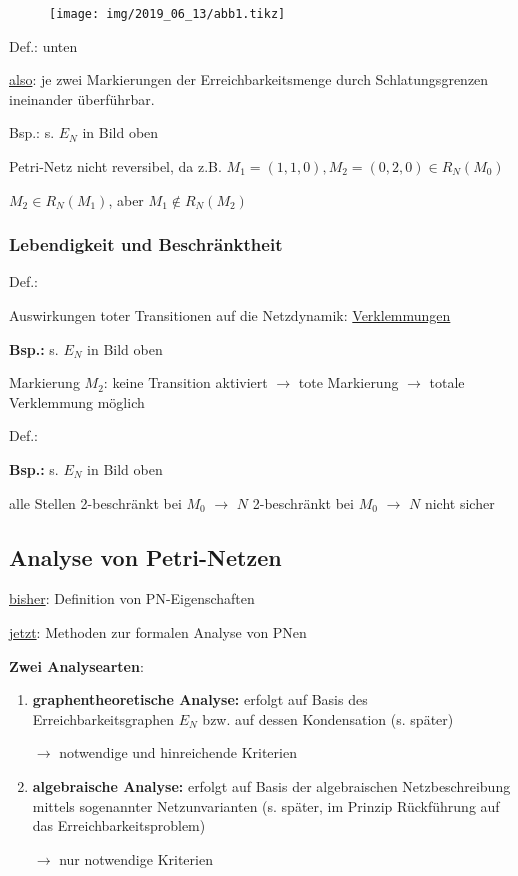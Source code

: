 
	\begin{figure}[H]
		\centering
		\texttt{[image: img/2019\_06\_13/abb1.tikz]}
	\end{figure}
	
Def.:  unten

\underline{also}: je zwei Markierungen der Erreichbarkeitsmenge durch Schlatungsgrenzen ineinander überführbar.

Bsp.: s. $E_N$ in Bild oben

Petri-Netz nicht reversibel, da z.B. $M_1 = (1,1,0), M_2 = (0,2,0) \in R_N(M_0)$

$M_2 \in R_N(M_1)$, aber $M_1\notin R_N(M_2)$ 

\subsubsection{Lebendigkeit und Beschränktheit}
Def.: 

Auswirkungen toter Transitionen auf die Netzdynamik: \underline{Verklemmungen} 

\textbf{Bsp.:} s. $E_N$ in Bild oben

Markierung $M_2$: keine Transition aktiviert $\rightarrow$ tote Markierung $\rightarrow$ totale Verklemmung möglich

Def.: 

\textbf{Bsp.:} s. $E_N$ in Bild oben

alle Stellen 2-beschränkt bei $M_0$ $\rightarrow$ $N$ 2-beschränkt bei $M_0$ $\rightarrow$ $N$ nicht sicher 

\subsection{Analyse von Petri-Netzen}
\underline{bisher}: Definition von PN-Eigenschaften

\underline{jetzt}: Methoden zur formalen Analyse von PNen

\textbf{Zwei Analysearten}:

\begin{enumerate}
	\item{\textbf{graphentheoretische Analyse:}} erfolgt auf Basis des Erreichbarkeitsgraphen $E_N$ bzw. auf dessen Kondensation (s. später) 
	
	$\rightarrow$ notwendige und hinreichende Kriterien
	
	\item{\textbf{algebraische Analyse:}} erfolgt auf Basis der algebraischen Netzbeschreibung mittels sogenannter Netzunvarianten (s. später, im Prinzip Rückführung auf das Erreichbarkeitsproblem)
	
	$\rightarrow$ nur notwendige Kriterien
\end{enumerate}

